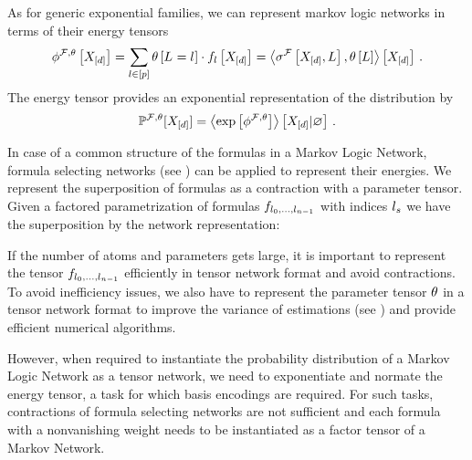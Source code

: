 

As for generic exponential families, we can represent markov logic networks in terms of their energy tensors
\begin{align}
	\phi^{\mathcal{F},\theta}\left[X_{[d]}\right]
	= \sum_{l\in[p]} \theta\left[L_{}=l_{}\right] \cdot f_{l}\left[X_{[d]}\right] 
	= \left\langle \sigma^{\mathcal{F}}\left[X_{[d]},L\right],\theta\left[L\right]\right\rangle \left[ X_{[d]} \right] \, .
\end{align}
The energy tensor provides an exponential representation of the distribution by
\begin{align}
	\mathbb{P}^{\mathcal{F},\theta}[X_{[d]}] = \left\langle \mathrm{exp}\left[\phi^{\mathcal{F},\theta}\right]\right\rangle \left[ X_{[d]} | \varnothing \right] \, .
\end{align}

In case of a common structure of the formulas in a Markov Logic Network, formula selecting networks (see ) can be applied to represent their energies.
We represent the superposition of formulas as a contraction with a parameter tensor.
Given a factored parametrization of formulas $f_{l_{0},\ldots,l_{n-1}}$ with indices $l_{s}$ we have the superposition by the network representation:
\begin{center}
	
\end{center}


If the number of atoms and parameters gets large, it is important to represent the tensor ${f_{l_{0},\ldots,l_{n-1}}}$ efficiently in tensor network format and avoid contractions.
To avoid inefficiency issues, we also have to represent the parameter tensor $\theta$ in a tensor network format to improve the variance of estimations (see ) and provide efficient numerical algorithms.

However, when required to instantiate the probability distribution of a Markov Logic Network as a tensor network, we need to exponentiate and normate the energy tensor, a task for which basis encodings are required.
For such tasks, contractions of formula selecting networks are not sufficient and each formula with a nonvanishing weight needs to be instantiated as a factor tensor of a Markov Network. 






